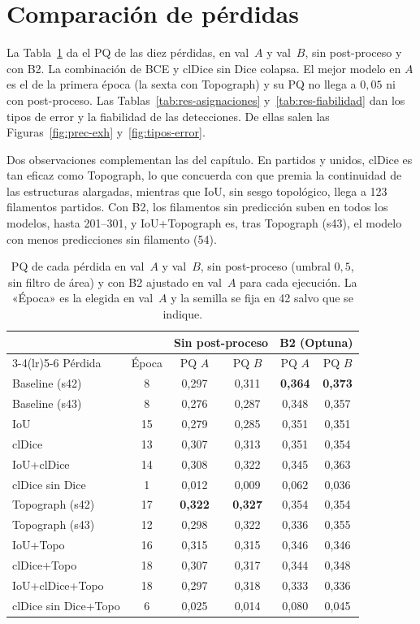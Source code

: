 \section{Comparación de pérdidas}
\label{sec:anx-perdidas}

La Tabla~\ref{tab:res-perdidas} da el PQ de las diez pérdidas, en val~$A$
y val~$B$, sin post-proceso y con B2. La combinación de BCE y clDice sin
Dice colapsa. El mejor modelo en $A$ es el de la primera época (la sexta
con Topograph) y su PQ no llega a $0{,}05$ ni con post-proceso. Las
Tablas~\ref{tab:res-asignaciones} y~\ref{tab:res-fiabilidad} dan los
tipos de error y la fiabilidad de las detecciones. De ellas salen las
Figuras~\ref{fig:prec-exh} y~\ref{fig:tipos-error}.

Dos observaciones complementan las del capítulo. En partidos y unidos,
clDice es tan eficaz como Topograph, lo que concuerda con que premia la
continuidad de las estructuras alargadas, mientras que IoU, sin sesgo
topológico, llega a 123 filamentos partidos. Con B2, los filamentos
sin predicción suben en todos los modelos, hasta 201--301, y
IoU+Topograph es, tras Topograph (s43), el modelo con menos predicciones
sin filamento (54).

\begin{table}[htbp]
\centering
\small
\begin{tabular}{@{}lccccc@{}}
\toprule
 & & \multicolumn{2}{c}{Sin post-proceso} & \multicolumn{2}{c}{B2 (Optuna)}\\
\cmidrule(lr){3-4}\cmidrule(lr){5-6}
Pérdida & Época & PQ $A$ & PQ $B$ & PQ $A$ & PQ $B$\\
\midrule
Baseline (s42) & 8 & 0,297 & 0,311 & \textbf{0,364} & \textbf{0,373}\\
Baseline (s43) & 8 & 0,276 & 0,287 & 0,348 & 0,357\\
IoU & 15 & 0,279 & 0,285 & 0,351 & 0,351\\
clDice & 13 & 0,307 & 0,313 & 0,351 & 0,354\\
IoU+clDice & 14 & 0,308 & 0,322 & 0,345 & 0,363\\
clDice sin Dice & 1 & 0,012 & 0,009 & 0,062 & 0,036\\
\midrule
Topograph (s42) & 17 & \textbf{0,322} & \textbf{0,327} & 0,354 & 0,354\\
Topograph (s43) & 12 & 0,298 & 0,322 & 0,336 & 0,355\\
IoU+Topo & 16 & 0,315 & 0,315 & 0,346 & 0,346\\
clDice+Topo & 18 & 0,307 & 0,317 & 0,344 & 0,348\\
IoU+clDice+Topo & 18 & 0,297 & 0,318 & 0,333 & 0,336\\
clDice sin Dice+Topo & 6 & 0,025 & 0,014 & 0,080 & 0,045\\
\bottomrule
\end{tabular}
\caption{PQ de cada pérdida en val~$A$ y val~$B$, sin post-proceso
(umbral $0{,}5$, sin filtro de área) y con B2 ajustado en val~$A$ para
cada ejecución. La «Época» es la elegida en val~$A$ y la semilla se fija en 42 salvo que
se indique.}
\label{tab:res-perdidas}
\end{table}


